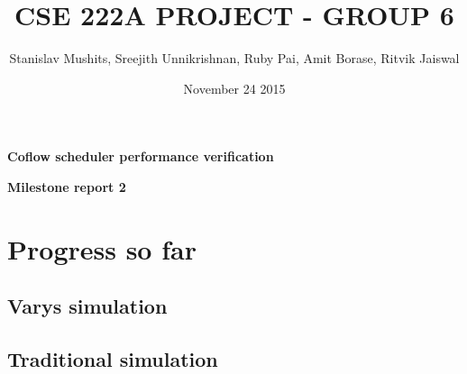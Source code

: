 \documentclass{article}
\title{CSE 222A PROJECT - GROUP 6}
\author{Stanislav Mushits, Sreejith Unnikrishnan, Ruby Pai, Amit Borase, Ritvik Jaiswal }
\date{November 24 2015}
\begin{document}
\maketitle

\begin{center}
\textbf{Coflow scheduler performance verification}
\end{center}

\begin{center}
\textbf{Milestone report 2}
\end{center}

\section{Progress so far}

\subsection{Varys simulation}

\subsection{Traditional simulation}
\end{document}
